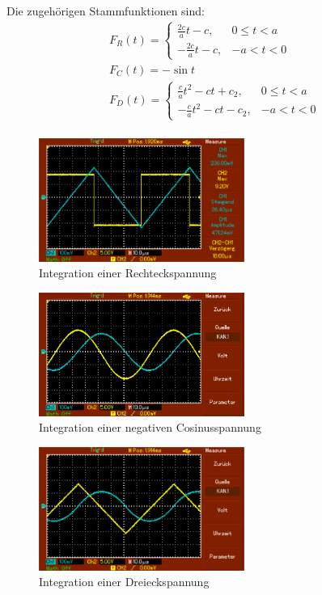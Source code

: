 Die zugehörigen Stammfunktionen sind:
\begin{align}
	&F_R(t) = \begin{cases}
		\frac{2c}{a} t - c, & 0\leq t < a \\
		-\frac{2c}{a} t - c, & -a < t < 0
	\end{cases} \\
	&F_C(t) = -\sin{t} \\
	&F_D(t) = \begin{cases}
		\frac{c}{a} t^2-ct + c_2, & 0\leq t < a \\
		-\frac{c}{a} t^2-ct - c_2, & -a < t < 0
	\end{cases} \\
\end{align}


\begin{figure}[h!]
	\centering
	\includegraphics[width=0.6\textwidth]{MAP002.png}
	\caption{Integration einer Rechteckspannung}
	\label{fig:integral1}
\end{figure} 

\begin{figure}[h!]
	\centering
	\includegraphics[width=0.6\textwidth]{MAP003.png}
	\caption{Integration einer negativen Cosinusspannung}
	\label{fig:integral2}
\end{figure} 

\begin{figure}[h!]
	\centering
	\includegraphics[width=0.6\textwidth]{MAP004.png}
	\caption{Integration einer Dreieckspannung}
	\label{fig:integral3}
\end{figure} 






	
